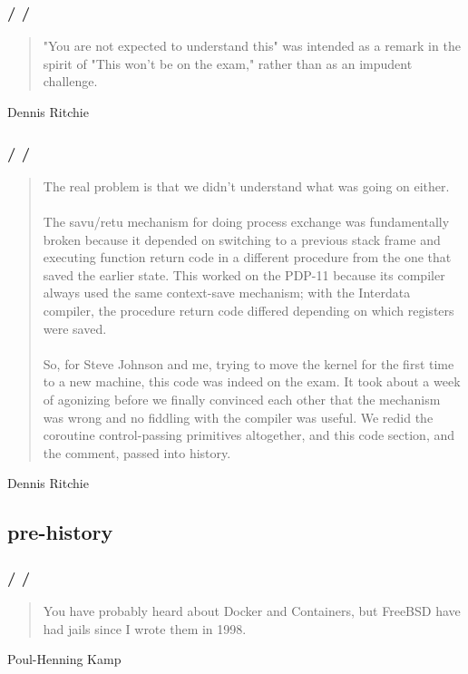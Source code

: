 \documentclass{beamer}
\newcommand{\autotitle}
{\frametitle{
    \secname
    \ifx\insertsubsection\empty
    \else
        /\subsecname
        \ifx\insertsubsubsection\empty\else/\subsubsecname\fi
    \fi}}
\begin{document}
\begin{frame}
    \autotitle
    \begin{quote}
        "You are not expected to understand this" was intended as a remark in
        the spirit of "This won't be on the exam," rather than as an impudent
        challenge.
    \end{quote}
    Dennis Ritchie
    \cite{dennis_you_are_not_expected_explanation}
\end{frame}

\begin{frame}
    \autotitle
    \begin{quote}
        The real problem is that we didn't understand what was going on either.
        \\~\\
        \scriptsize
        The savu/retu mechanism for doing process exchange was fundamentally
        broken because it depended on switching to a previous stack frame and
        executing function return code in a different procedure from the one
        that saved the earlier state.  This worked on the PDP-11 because its
        compiler always used the same context-save mechanism; with the
        Interdata compiler, the procedure return code differed depending on
        which registers were saved.
        \\~\\
        So, for Steve Johnson and me, trying to move the kernel for the first
        time to a new machine, this code was indeed on the exam.  It took about
        a week of agonizing before we finally convinced each other that the
        mechanism was wrong and no fiddling with the compiler was useful.  We
        redid the coroutine control-passing primitives altogether, and this
        code section, and the comment, passed into history.
    \end{quote}
    Dennis Ritchie
\end{frame}

\subsection{pre-history}

\begin{frame}
    \autotitle
    \begin{quote}
        You have probably heard about Docker and Containers, but FreeBSD
        have had jails since I wrote them in 1998.
    \end{quote}
    Poul-Henning Kamp
    \cite{kamp_varnish}
\end{frame}
\end{document}
